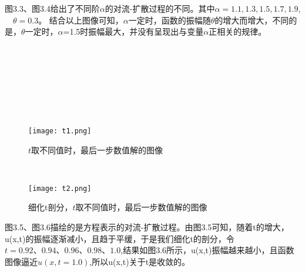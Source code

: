 图3.3、图3.4给出了不同阶$\alpha$的对流-扩散过程的不同。其中$\alpha=1.1,1.3,1.5,1.7,1.9$,$\quad$$\theta=0.3$。
结合以上图像可知，$\alpha$一定时，函数的振幅随$\theta$的增大而增大，不同的是，$\theta$一定时，$\alpha$=1.5时振幅最大，并没有呈现出与变量$\alpha$正相关的规律。
\\
\\
\\
\\
\\
\\
\\
\\
\begin{figure}[h]
	\begin{minipage}[t]{0.4\linewidth}%
		\centering     %
		\texttt{[image: t1.png]}
		\caption{$t$取不同值时，最后一步数值解的图像}%
		\label{fig:liuchengtu1}%
	\end{minipage} 
	\hfill
	\begin{minipage}[t]{0.4\linewidth}
		\centering
		\texttt{[image: t2.png]}
		\caption{细化t剖分，$t$取不同值时，最后一步数值解的图像}%
		\label{fig:liuchengtu2}
	\end{minipage}
\end{figure}

图3.5、图3.6描绘的是方程表示的对流-扩散过程。由图3.5可知，随着t的增大，u(x,t)的振幅逐渐减小，且趋于平缓，于是我们细化t的剖分，令$t=0.92、0.94、0.96、0.98、1.0$,结果如图3.6所示，u(x,t)振幅越来越小，且函数图像逼近$u(x,t=1.0)$,所以u(x,t)关于t是收敛的。

